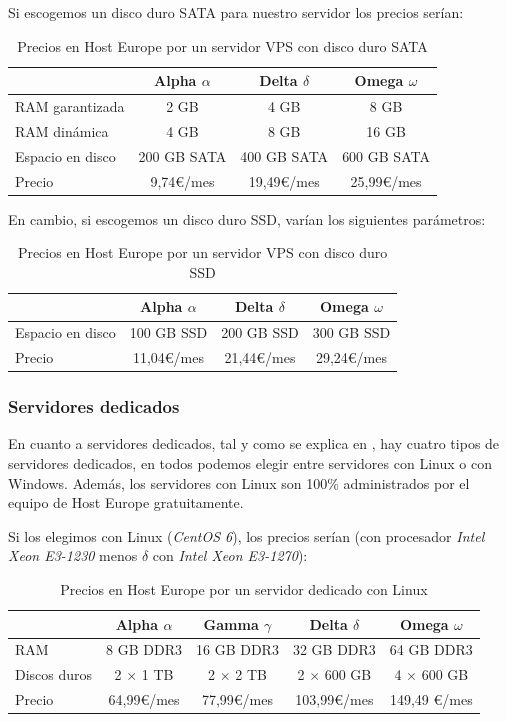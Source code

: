 \documentclass[10pt,a4paper,spanish]{article}
\numberwithin{equation}{section} %
\numberwithin{figure}{section} %
\numberwithin{table}{section} %
\begin{document}
Si escogemos un disco duro SATA para nuestro servidor los precios serían:

\begin{table}[!h]
\begin{tabular}{l | c | c | c }
 & Alpha $\alpha$ & Delta $\delta$ & Omega $\omega$ \\
 \hline
 RAM garantizada & 2 GB & 4 GB & 8 GB \\
 RAM dinámica & 4 GB & 8 GB & 16 GB \\
 Espacio en disco & 200 GB SATA & 400 GB SATA & 600 GB SATA \\
 Precio & 9,74\euro/mes & 19,49\euro/mes &  25,99\euro/mes \\
 \end{tabular}
 \caption{Precios en Host Europe por un servidor VPS con disco duro SATA}
 \label{hevpssata}
 \end{table}

En cambio, si escogemos un disco duro SSD, varían los siguientes parámetros:

\begin{table}[!h]
\begin{tabular}{l | c | c | c }
 & Alpha $\alpha$ & Delta $\delta$ & Omega $\omega$ \\
 \hline
 Espacio en disco & 100 GB SSD & 200 GB SSD & 300 GB SSD \\
 Precio & 11,04\euro/mes & 21,44\euro/mes &  29,24\euro/mes \\
 \end{tabular}
 \caption{Precios en Host Europe por un servidor VPS con disco duro SSD}
 \label{hevpsssd}
 \end{table}

 \subsubsection{Servidores dedicados}
 En cuanto a servidores dedicados, tal y como se explica en \cite{hese}, hay cuatro tipos de servidores dedicados, en todos podemos elegir entre servidores con Linux o con Windows. Además, los servidores con Linux son 100\% administrados por el equipo de Host Europe gratuitamente.

 Si los elegimos con Linux (\textit{CentOS 6}), los precios serían (con procesador \textit{Intel Xeon E3-1230} menos $\delta$ con \textit{Intel Xeon E3-1270}):
\begin{table}[!h]
\begin{tabular}{l | c | c | c | c}
 & Alpha $\alpha$ & Gamma $\gamma$ & Delta $\delta$ & Omega $\omega$ \\
\hline
RAM & 8 GB DDR3 & 16 GB DDR3 & 32 GB DDR3 & 64 GB DDR3 \\
Discos duros & 2 $\times$ 1 TB & 2 $\times$ 2 TB & 2 $\times$ 600 GB & 4 $\times$ 600 GB \\
Precio & 64,99\euro/mes & 77,99\euro/mes & 103,99\euro/mes & 149,49 \euro/mes \\
\end{tabular}
\caption{Precios en Host Europe por un servidor dedicado con Linux}
\label{heselin}
\end{table}
\end{document}
